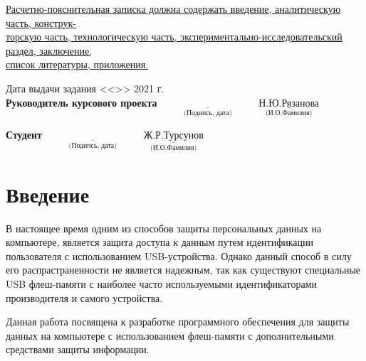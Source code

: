 \documentclass[a4paper, 10pt]{article}
\begin{document}
\begin{titlepage}
	\underline{Расчетно-пояснительная записка должна содержать введение, аналитическую часть, конструк-} \\ \underline{торскую часть, технологическую часть, экспериментально-исследовательский раздел, заключение,} \\ \underline{список литературы, приложения. \hspace*{10.5cm}}
	
	\begin{flushleft}
		\small Дата выдачи задания <<\underline{\hspace{1cm}}>> \underline{\hspace{3cm}} 2021 г.
		\newline
		\\ \small \textbf{Руководитель курсового проекта}
		\small \hspace{3cm}$\underset{\text{(Подипсь, дата)}}{\underline{\hspace{4cm}}}$ 
		\small \hspace{4mm}$\underset{\text{(И.О.Фамилия)}}{\underline{\text{Н.Ю.Рязанова}}}$ 
	\end{flushleft}
	\begin{flushleft}
		\small \textbf{Студент}
		\small \hspace{7.2cm}$\underset{\text{(Подипсь, дата)}}{\underline{\hspace{4cm}}}$ 
		\small \hspace{5mm}$\underset{\text{(И.О.Фамилия)}}{\underline{\text{Ж.Р.Турсунов}}}$ 
	\end{flushleft}
	
\end{titlepage}
\setcounter{page}{3}
\tableofcontents
\clearpage
\newpage


\section*{Введение}

\hspace*{5mm} В настоящее время одним из способов защиты персональных данных на компьютере, является защита доступа к данным путем идентификации пользователя с использованием USB-устройства. Однако данный способ в силу его распрастраненности не является надежным, так как существуют специальные USB флеш-памяти с наиболее часто используемыми идентификаторами производителя и самого устройства.

Данная работа посвящена к разработке программного обеспечения для защиты данных на компьютере с использованием флеш-памяти с дополнительными средствами защиты информации.
\end{document}
